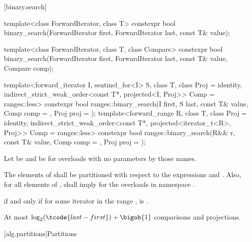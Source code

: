 [binary.search]{}

%
\begin{itemdecl}
template<class ForwardIterator, class T>
  constexpr bool
    binary_search(ForwardIterator first, ForwardIterator last,
                  const T& value);

template<class ForwardIterator, class T, class Compare>
  constexpr bool
    binary_search(ForwardIterator first, ForwardIterator last,
                  const T& value, Compare comp);

template<forward_iterator I, sentinel_for<I> S, class T, class Proj = identity,
         indirect_strict_weak_order<const T*, projected<I, Proj>> Comp = ranges::less>
  constexpr bool ranges::binary_search(I first, S last, const T& value, Comp comp = {},
                                       Proj proj = {});
template<forward_range R, class T, class Proj = identity,
         indirect_strict_weak_order<const T*, projected<iterator_t<R>, Proj>> Comp =
           ranges::less>
  constexpr bool ranges::binary_search(R&& r, const T& value, Comp comp = {},
                                       Proj proj = {});
\end{itemdecl}

\begin{itemdescr}
\pnum
Let  be  and
 be 
for overloads with no parameters by those names.

\pnum
\requires
The elements  of 
shall be partitioned with respect to the expressions
 and
.
Also, for all elements  of \tcode{[first, last)},
 shall imply 
for the overloads in namespace .

\pnum
\returns
{} if and only if
for some iterator  in the range ,
is .

\pnum
\complexity
At most $\log_2(\tcode{last - first}) + \bigoh{1}$ comparisons and projections.
\end{itemdescr}

[alg.partitions]{Partitions}

